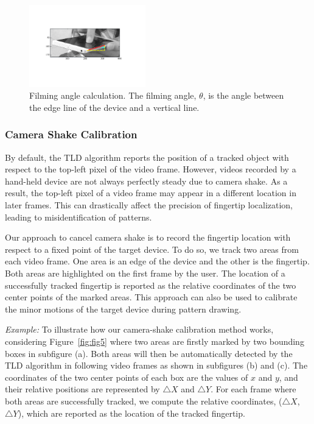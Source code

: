 \begin{figure}[!t]
    \centering
    \includegraphics[width=0.45\textwidth]{fig/line_detection.pdf}
    \caption{Filming angle calculation. The filming angle, $\theta$, is the angle between the edge line of the device and a vertical line.}
    \label{fig:line_detection}
\end{figure}

        \subsubsection{Camera Shake Calibration}
        \label{secction:shake}
         By default, the TLD algorithm reports the position of a tracked object with respect to the top-left pixel of the video frame.
         However, videos recorded by a hand-held device are not always perfectly steady due to
        camera shake. As a result, the top-left pixel of a video frame may appear in a different location in later frames.
        This can drastically affect the precision of fingertip localization, leading to misidentification of patterns.

        Our approach to cancel camera shake is to record the fingertip
        location with respect to a fixed point of the target device. To do so, we track two
        areas from each video frame. One area is an edge of the device and
        the other is the fingertip. Both areas are highlighted on the
        first frame by the user.
        The location of a successfully tracked fingertip is reported as
        the relative coordinates of the two center points of the marked areas.
        This approach can also be used to calibrate the minor motions of the target device during pattern drawing.

        \noindent \emph{Example:} To illustrate how our camera-shake calibration method  works, considering
        Figure~\ref{fig:fig5} where two areas are firstly marked by two
        bounding boxes in subfigure (a).
        Both areas will
        then be automatically detected by the TLD algorithm in following video
        frames as shown in subfigures (b) and (c).
        The coordinates of the two center points of each box are the values of $x$ and $y$, and their relative positions are represented by
        $\triangle X$ and $\triangle Y$.
        For each frame
        where both areas are successfully tracked, we
        compute the relative coordinates, ($\triangle X$, $\triangle Y$), which are reported as the location of the tracked fingertip.

